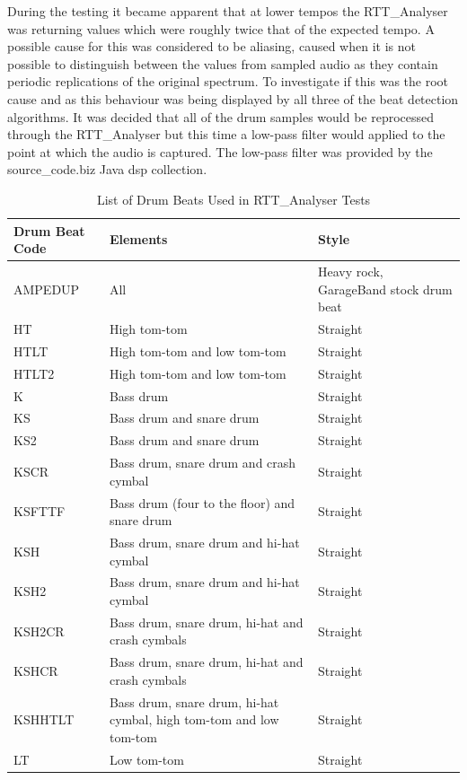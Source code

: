 \documentclass[a4paper, 11pt]{article}
\begin{document}
During the testing it became apparent that at lower tempos the RTT\_Analyser was returning values which were roughly twice that of the expected tempo. A possible cause for this was considered to be aliasing, caused when it is not possible to distinguish between the values from sampled audio as they contain periodic replications of the original spectrum\cite{lyons}. To investigate if this was the root cause and as this behaviour was being displayed by all three of the beat detection algorithms. It was decided that all of the drum samples would be reprocessed through the RTT\_Analyser but this time a low-pass filter would applied to the point at which the audio is captured. The low-pass filter was provided by the source\_code.biz Java dsp collection.
\clearpage

\begin{table}[htbp]
\caption{List of Drum Beats Used in RTT\_Analyser Tests} 
\centering
\begin{tabular}{|p{3cm}|p{5cm}|l|}
\hline
\textbf{Drum Beat Code} & \textbf{Elements} & \textbf{Style} \\ [0.5ex]
\hline 
AMPEDUP & All & Heavy rock, GarageBand stock drum beat\\
\hline 
HT & High tom-tom & Straight\\
\hline 
HTLT & High tom-tom and low tom-tom & Straight\\
\hline 
HTLT2 & High tom-tom and low tom-tom & Straight\\
\hline 
K & Bass drum & Straight\\
\hline 
KS & Bass drum and snare drum & Straight\\
\hline 
KS2 & Bass drum and snare drum & Straight\\
\hline 
KSCR & Bass drum, snare drum and crash cymbal & Straight\\
\hline 
KSFTTF & Bass drum (four to the floor) and snare drum & Straight\\
\hline 
KSH & Bass drum, snare drum and hi-hat cymbal & Straight\\
\hline 
KSH2 & Bass drum, snare drum and hi-hat cymbal & Straight\\
\hline 
KSH2CR & Bass drum, snare drum, hi-hat and crash cymbals & Straight\\
\hline 
KSHCR & Bass drum, snare drum, hi-hat and crash cymbals & Straight\\
\hline 
KSHHTLT & Bass drum, snare drum, hi-hat cymbal, high tom-tom and low tom-tom & Straight\\
\hline 
LT & Low tom-tom & Straight\\

\end{tabular}
\end{table}
\end{document}
